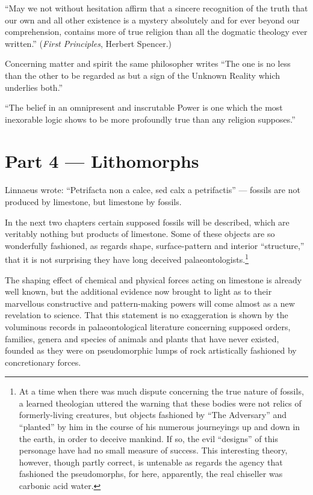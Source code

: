 \documentclass[a4paper, 12pt, oneside, landscape]{article}
\begin{document}
``May we not without hesitation affirm that a sincere recognition of the truth that our own and all other existence is a mystery absolutely and for ever beyond our comprehension, contains more of true religion than all the dogmatic theology ever written.'' (\emph{First Principles}, Herbert Spencer.)

Concerning matter and spirit the same philosopher writes ``The one is no less than the other to be regarded as but a sign of the Unknown Reality which underlies both.''

``The belief in an omnipresent and inscrutable Power is one which the most inexorable logic shows to be more profoundly true than any religion supposes.''
\clearpage
\section{Part 4 --- Lithomorphs}
\paragraph{}
Linnaeus wrote: ``Petrifacta non a calce, sed calx a petrifactis'' --- fossils are not produced by limestone, but limestone by fossils.

In the next two chapters certain supposed fossils will be described, which are veritably nothing but products of limestone. Some of these objects are so wonderfully fashioned, as regards shape, surface-pattern and interior ``structure,'' that it is not surprising they have long deceived palaeontologists.\footnote{At a time when there was much dispute concerning the true nature of fossils, a learned theologian uttered the warning that these bodies were not relics of formerly-living creatures, but objects fashioned by ``The Adversary'' and ``planted'' by him in the course of his numerous journeyings up and down in the earth, in order to deceive mankind. If so, the evil ``designs'' of this personage have had no small measure of success. This interesting theory, however, though partly correct, is untenable as regards the agency that fashioned the pseudomorphs, for here, apparently, the real chiseller was carbonic acid water.}

The shaping effect of chemical and physical forces acting on limestone is already well known, but the additional evidence now brought to light as to their marvellous constructive and pattern-making powers will come almost as a new revelation to science. That this statement is no exaggeration is shown by the voluminous records in palaeontological literature concerning supposed orders, families, genera and species of animals and plants that have never existed, founded as they were on pseudomorphic lumps of rock artistically fashioned by concretionary forces.
\end{document}
